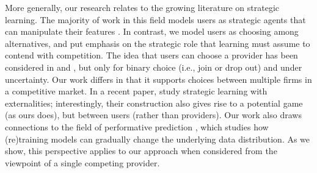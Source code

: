 More generally, our research relates to the growing literature on strategic learning.
The majority of work in this field models users as strategic agents that can manipulate their features \citep[e.g.,][]{hardt2016strategic,levanon2021strategic}.
In contrast, we model users as choosing among alternatives,
and put emphasis on the strategic role that learning must assume to contend with competition.
The idea that users can choose a provider has been considered in 
\citet{koren2023gatekeeper} and \citet{horowitz2024classification},
but only for binary choice (i.e., join or drop out) and under uncertainty.
Our work differs in that it supports choices between multiple firms in a competitive market.
In a recent paper, \citet{chen2025strategic} study strategic learning with externalities; interestingly, their construction also gives rise to a potential game (as ours does), but between users (rather than providers).
Our work also draws connections to the field of performative prediction \citep{perdomo2020performative}, which studies how (re)training models can gradually change the underlying data distribution.
As we show, this perspective applies to our approach when considered
from the viewpoint of a single competing provider.
\squeeze





